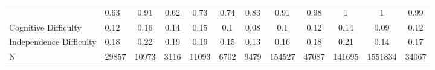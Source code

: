 \begin{table}[ht]
\begin{tabular}{>{\raggedright\arraybackslash}p{3.2cm}|lcccccc|cccc}
  \multicolumn{1}{>{\raggedleft\arraybackslash}p{3cm}|}{\makebox[3cm][r]{English Speakers }}& 0.63 & 0.91 & 0.62 & 0.73 & 0.74 & 0.83 & 0.91 & 0.98 & 1 & 1 & 0.99 \\ 
  Cognitive Difficulty & 0.12 & 0.16 & 0.14 & 0.15 & 0.1 & 0.08 & 0.1 & 0.12 & 0.14 & 0.09 & 0.12 \\ 
  Independence Difficulty & 0.18 & 0.22 & 0.19 & 0.19 & 0.15 & 0.13 & 0.16 & 0.18 & 0.21 & 0.14 & 0.17 \\ 
  N & 29857 & 10973 & 3116 & 11093 & 6702 & 9479 & 154527 & 47087 & 141695 & 1551834 & 34067 \\ 
   \hline
\end{tabular}
\endgroup
\end{table}

